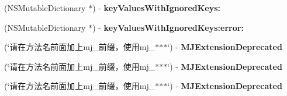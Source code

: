 \begin{DoxyCompactItemize}
(N\+S\+Mutable\+Dictionary $\ast$) -\/ {\bfseries key\+Values\+With\+Ignored\+Keys\+:}
\item 
\mbox{\label{category_n_s_object_07_m_j_key_value_deprecated__v__2__5__16_08_ae0e5463129276db571a607b326b1f440}} 
(N\+S\+Mutable\+Dictionary $\ast$) -\/ {\bfseries key\+Values\+With\+Ignored\+Keys\+:error\+:}
\item 
\mbox{\label{category_n_s_object_07_m_j_key_value_deprecated__v__2__5__16_08_a6da7166fe843e9d1c5173a744acbbb3f}} 
(\char`\"{}请在方法名前面加上mj\+\_\+前缀，使用mj\+\_\+$\ast$$\ast$$\ast$\char`\"{}) -\/ {\bfseries M\+J\+Extension\+Deprecated}
\item 
\mbox{\label{category_n_s_object_07_m_j_key_value_deprecated__v__2__5__16_08_a6da7166fe843e9d1c5173a744acbbb3f}} 
(\char`\"{}请在方法名前面加上mj\+\_\+前缀，使用mj\+\_\+$\ast$$\ast$$\ast$\char`\"{}) -\/ {\bfseries M\+J\+Extension\+Deprecated}
\item 
\mbox{\label{category_n_s_object_07_m_j_key_value_deprecated__v__2__5__16_08_a6da7166fe843e9d1c5173a744acbbb3f}} 
(\char`\"{}请在方法名前面加上mj\+\_\+前缀，使用mj\+\_\+$\ast$$\ast$$\ast$\char`\"{}) -\/ {\bfseries M\+J\+Extension\+Deprecated}
\end{DoxyCompactItemize}
